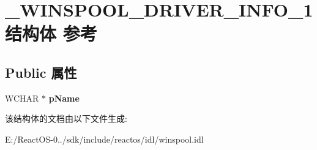 \hypertarget{struct___w_i_n_s_p_o_o_l___d_r_i_v_e_r___i_n_f_o__1}{}\section{\+\_\+\+W\+I\+N\+S\+P\+O\+O\+L\+\_\+\+D\+R\+I\+V\+E\+R\+\_\+\+I\+N\+F\+O\+\_\+1结构体 参考}
\label{struct___w_i_n_s_p_o_o_l___d_r_i_v_e_r___i_n_f_o__1}
\subsection*{Public 属性}
\begin{DoxyCompactItemize}
\item 
\mbox{\label{struct___w_i_n_s_p_o_o_l___d_r_i_v_e_r___i_n_f_o__1_a7c476bb4756e4dae1af96d384e73d73d}} 
W\+C\+H\+AR $\ast$ {\bfseries p\+Name}
\end{DoxyCompactItemize}


该结构体的文档由以下文件生成\+:\begin{DoxyCompactItemize}
\item 
E\+:/\+React\+O\+S-\/0../sdk/include/reactos/idl/winspool.\+idl\end{DoxyCompactItemize}
